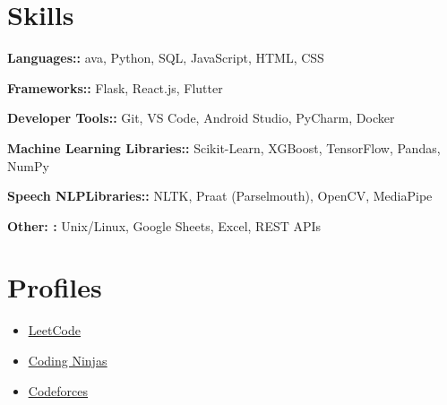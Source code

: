 \documentclass[letterpaper,11pt]{article}
\newcommand{\resumeItem}[1]{
  \item\small{
    {#1 \vspace{-2pt}}
  }
}
\newcommand{\resumeSubHeadingListStart}{\begin{itemize}[leftmargin=0.15in, label={}]}
\newcommand{\resumeSubHeadingListEnd}{\end{itemize}}
\newcommand{\resumeItemListStart}{\begin{itemize}}
\newcommand{\resumeItemListEnd}{\end{itemize}\vspace{-5pt}}
\begin{document}
\section{Skills}
  \vspace{2pt}
  \resumeSubHeadingListStart
    \small{\item{

  
    \textbf{ Languages::}{ ava, Python, SQL, JavaScript, HTML, CSS} \ \vspace{3pt}

    \textbf{ Frameworks::}{  Flask, React.js, Flutter} \ \vspace{3pt}

    \textbf{ Developer Tools::}{  Git, VS Code, Android Studio, PyCharm, Docker} \ \vspace{3pt}

    \textbf{ Machine Learning Libraries::}{ Scikit-Learn, XGBoost, TensorFlow, Pandas, NumPy} \ \vspace{3pt}

    \textbf{ Speech NLPLibraries::}{ NLTK, Praat (Parselmouth), OpenCV, MediaPipe} \ \vspace{3pt}

    \textbf{ Other: :}{ Unix/Linux, Google Sheets, Excel, REST APIs} \ \vspace{3pt}

}}
\resumeSubHeadingListEnd




\section{Profiles}
  \vspace{2pt}
  \resumeItemListStart
  \resumeItem{\underline{\href{https://leetcode.com/u/Bhavya111/}{LeetCode}}}\resumeItem{\underline{\href{https://www.naukri.com/code360/profile/e8c0c045-94f7-42e6-927d-08b7c6d859be}{Coding Ninjas}}}\resumeItem{\underline{\href{https://codeforces.com/profile/trial99}{Codeforces}}}
  \resumeItemListEnd

\end{document}
